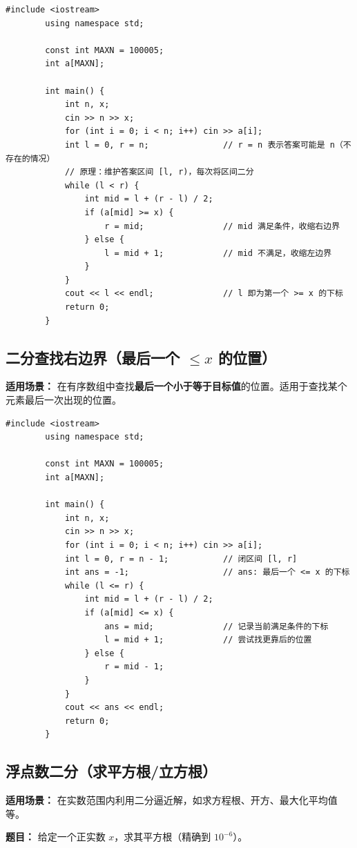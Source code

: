 \documentclass[12pt,a4paper]{ctexart}
\begin{document}
	\begin{lstlisting}[caption={二分查找——第一个大于等于 x 的位置（lower\_bound）}]
		#include <iostream>
		using namespace std;
		
		const int MAXN = 100005;
		int a[MAXN];
		
		int main() {
			int n, x;
			cin >> n >> x;
			for (int i = 0; i < n; i++) cin >> a[i];
			int l = 0, r = n;               // r = n 表示答案可能是 n（不存在的情况）
			// 原理：维护答案区间 [l, r)，每次将区间二分
			while (l < r) {
				int mid = l + (r - l) / 2;
				if (a[mid] >= x) {
					r = mid;                // mid 满足条件，收缩右边界
				} else {
					l = mid + 1;            // mid 不满足，收缩左边界
				}
			}
			cout << l << endl;              // l 即为第一个 >= x 的下标
			return 0;
		}
	\end{lstlisting}
	
	\subsection{二分查找右边界（最后一个 $\le x$ 的位置）}
	\textbf{适用场景：} 在有序数组中查找\textbf{最后一个小于等于目标值}的位置。适用于查找某个元素最后一次出现的位置。
	
	\begin{lstlisting}[caption={二分查找——最后一个小于等于 x 的位置}]
		#include <iostream>
		using namespace std;
		
		const int MAXN = 100005;
		int a[MAXN];
		
		int main() {
			int n, x;
			cin >> n >> x;
			for (int i = 0; i < n; i++) cin >> a[i];
			int l = 0, r = n - 1;           // 闭区间 [l, r]
			int ans = -1;                   // ans: 最后一个 <= x 的下标
			while (l <= r) {
				int mid = l + (r - l) / 2;
				if (a[mid] <= x) {
					ans = mid;              // 记录当前满足条件的下标
					l = mid + 1;            // 尝试找更靠后的位置
				} else {
					r = mid - 1;
				}
			}
			cout << ans << endl;
			return 0;
		}
	\end{lstlisting}
	
	\subsection{浮点数二分（求平方根/立方根）}
	\textbf{适用场景：} 在实数范围内利用二分逼近解，如求方程根、开方、最大化平均值等。
	
	\textbf{题目：} 给定一个正实数 $x$，求其平方根（精确到 $10^{-6}$）。
	
\end{document}
